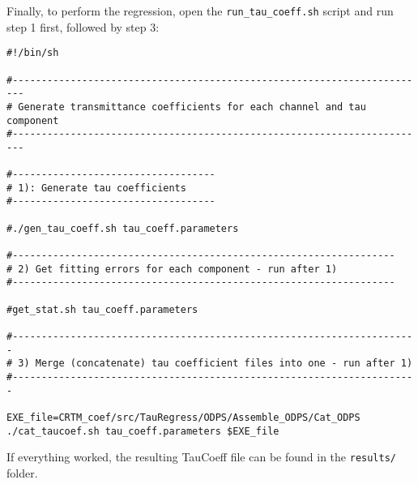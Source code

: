 Finally, to perform the regression, open the \verb|run_tau_coeff.sh| script and run step 1 first, followed by step 3:

\begin{verbatim}
#!/bin/sh

#------------------------------------------------------------------------
# Generate transmittance coefficients for each channel and tau component
#------------------------------------------------------------------------

#-----------------------------------
# 1): Generate tau coefficients
#-----------------------------------

#./gen_tau_coeff.sh tau_coeff.parameters

#------------------------------------------------------------------
# 2) Get fitting errors for each component - run after 1)
#------------------------------------------------------------------

#get_stat.sh tau_coeff.parameters

#----------------------------------------------------------------------
# 3) Merge (concatenate) tau coefficient files into one - run after 1)
#----------------------------------------------------------------------

EXE_file=CRTM_coef/src/TauRegress/ODPS/Assemble_ODPS/Cat_ODPS
./cat_taucoef.sh tau_coeff.parameters $EXE_file
\end{verbatim}

If everything worked, the resulting TauCoeff file can be found in the \verb|results/| folder.



